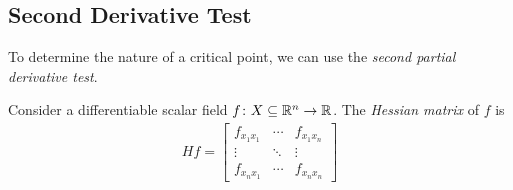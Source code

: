 \documentclass{article}
\begin{document}
\subsection{Second Derivative Test}

To determine the nature of a critical point, we can use the \emph{second partial derivative test}.

\begin{definition}
  Consider a differentiable scalar field $f \colon X \subseteq \mathbb{R}^n \to \mathbb{R}$.
  The \emph{Hessian matrix} of $f$ is
  \begin{align}
    Hf = \begin{bmatrix}
           f_{x_1 x_1} & \cdots & f_{x_1 x_n}
           \\
           \vdots      & \ddots & \vdots
           \\
           f_{x_n x_1} & \cdots & f_{x_n x_n}
         \end{bmatrix}
  \end{align}
\end{definition}
\end{document}
